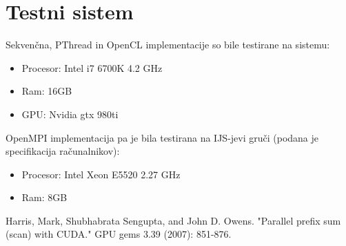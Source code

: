 \documentclass[a4paper,11pt]{article}
\begin{document}
\section{Testni sistem}
Sekvenčna, PThread in OpenCL implementacije so bile testirane na sistemu:
\begin{itemize}
\item Procesor: Intel i7 6700K 4.2 GHz
\item Ram: 16GB
\item GPU: Nvidia gtx 980ti
\end{itemize}
OpenMPI implementacija pa je bila testirana na IJS-jevi gruči (podana je specifikacija računalnikov):
\begin{itemize}
\item Procesor: Intel Xeon E5520 2.27 GHz
\item Ram: 8GB
\end{itemize}
\pagebreak

\begin{thebibliography}{99}
 Harris, Mark, Shubhabrata Sengupta, and John D. Owens. "Parallel prefix sum (scan) with CUDA." GPU gems 3.39 (2007): 851-876.
\end{thebibliography}
\end{document}
